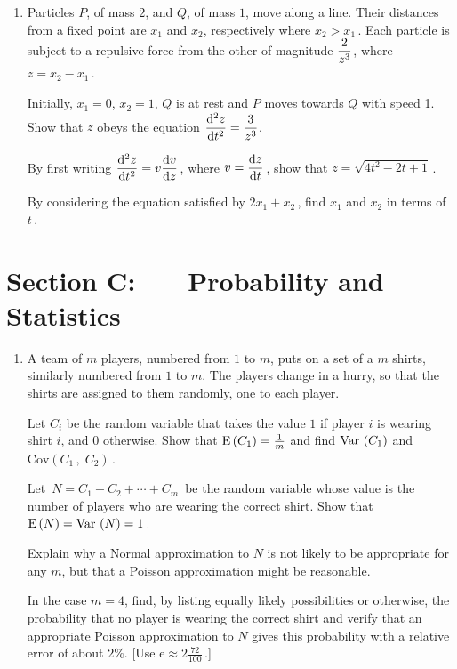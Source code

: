 \documentclass[a4, 11pt]{report}
\newlength{\qspace}
\newcounter{qnumber}
\newenvironment{question}%
 {\vspace{\qspace}
  \begin{enumerate}[\bfseries 1\quad][10]%
    \setcounter{enumi}{\value{qnumber}}%
    \item%
 }
{
  \end{enumerate}
  \filbreak
  \stepcounter{qnumber}
 }
\def\e{{\mathrm e}}
\def\var{{\rm Var}\,}
\begin{document}

\begin{question}
Particles $P$, of  mass $2$, and $Q$, of  mass $1$, 
move along a line. Their distances from a fixed point are $x_1$ and $x_2$, respectively
where $x_2>x_1\,$.
Each particle is subject  to a repulsive force from the other 
of magnitude $\displaystyle {2 \over z^3}$, where $z = x_2-x_1 \,$.

Initially, $x_1=0$, $x_2 = 1$, $Q$ is at rest and 
$P$ moves towards $Q$ with speed 1.  
Show that $z$ obeys the equation 
$\displaystyle {\mathrm{d}^2 z \over \mathrm{d}t^2} = {3 \over z^3}$. 

By first writing 
$\displaystyle {\mathrm{d}^2 z \over \mathrm{d}t^2} = v {\mathrm{d}v \over \mathrm{d}z} \,$, 
where $\displaystyle v={\mathrm{d}z \over \mathrm{d}t}\,$,
show that $z=\sqrt{4t^2-2t+1}\,$.

By considering the equation satisfied by $2x_1+x_2\,$,
find $x_1$ and $x_2$ in terms of $t \,$.
\end{question}
	

	
	\newpage
\section*{Section C: \ \ \ Probability and Statistics}


\begin{question}
A team of $m$ players, numbered from $1$ to $m$, 
puts on a set of a $m$ shirts, similarly numbered from $1$ to $m$. 
The players change in a hurry, so that the shirts are assigned to them randomly, 
one to each player.


Let $C_i$ be the random variable that takes the value $1$ if player $i$ is wearing shirt $i$, 
and 0 otherwise. Show that $\mathrm{E}\left(C_1\right)={1 \over m}$ 
and find 
$\var \left(C_1\right)$ and $\mathrm{Cov}\left(C_1 \, , \; C_2 \right) \,$.

Let $\, N = C_1 + C_2 + \cdots + C_m \,$ 
be the random variable whose value is the number of players who are wearing the correct shirt. 
Show that $\mathrm{E}\left(N\right)= \var \left(N\right) = 1 \,$.

Explain why a Normal approximation to $N$ is not likely to be appropriate for any $m$, 
but that a Poisson approximation might be reasonable.

In the case $m = 4$, find, by listing equally likely possibilities or otherwise, 
the probability that no player is wearing the correct shirt 
and verify that an appropriate Poisson approximation to $N$ 
gives this probability with a relative error  of about $2\%$. [Use $\e \approx 2\frac{72}{100} \,$.] 
\end{question}
\end{document}
